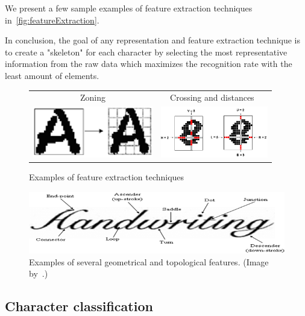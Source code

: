 We present a few sample examples of feature extraction techniques in~\cref{fig:featureExtraction}.

In conclusion, the goal of any representation and feature extraction technique is to create a "skeleton" for each character by selecting the most representative information from the raw data which maximizes the recognition rate with the least amount of elements. 

\begin{figure}[t]
\centering
{\sffamily
\begin{tabular}{cc}
Zoning & Crossing and distances~\citep{crossingAndDistances}\\
\includegraphics[height=6em]{img/textDetection/feature_zoning.png}
&
\includegraphics[height=6em]{img/textDetection/feature_crossing.png}
\end{tabular}
}
\caption{Examples of feature extraction techniques}
\label{fig:featureExtractionStatistical}
\end{figure}

\begin{figure}[t]
\centering
\includegraphics[width=0.8\linewidth]{img/textDetection/features_geometrical.png}
\caption{Examples of several geometrical and topological features.  (Image by~\citet{geometricalFeatures}.)}
\label{fig:featureExtractionGeometrical}
\end{figure}


\subsection{Character classification}

